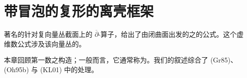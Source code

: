 \chapter{带冒泡的\personFloer{}复形的离壳框架}
\label{ch:off-shell-complex}

著名的\termRiemannRochFormula{}针对复向量丛截面上的 $\overline\partial$-算子，给出了由闭\personRiemann{}曲面出发的\termHolomorphicMap{}之\termModuliSpace{}的\termVirtualDimension{}公式。这个虚维数公式涉及该向量丛的\termFirstChernNumber{}。

本章回顾第一\personChern{}数之构造；一般而言，它通常称为\emph{\termMaslovIndex{}}。我们的叙述综合了 (Gr85)、(Oh95b) 与 (KL01) 中的处理。











